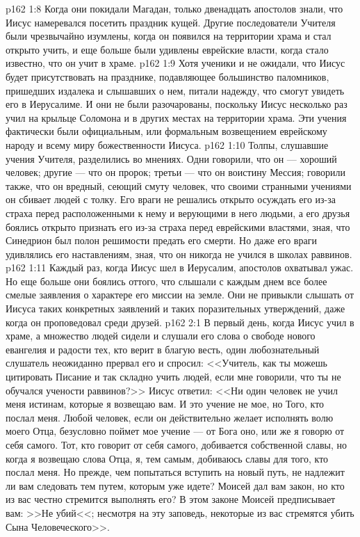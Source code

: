 \vs p162 1:8 Когда они покидали Магадан, только двенадцать апостолов знали, что Иисус намеревался посетить праздник кущей. Другие последователи Учителя были чрезвычайно изумлены, когда он появился на территории храма и стал открыто учить, и еще больше были удивлены еврейские власти, когда стало известно, что он учит в храме.
\vs p162 1:9 Хотя ученики и не ожидали, что Иисус будет присутствовать на празднике, подавляющее большинство паломников, пришедших издалека и слышавших о нем, питали надежду, что смогут увидеть его в Иерусалиме. И они не были разочарованы, поскольку Иисус несколько раз учил на крыльце Соломона и в других местах на территории храма. Эти учения фактически были официальным, или формальным возвещением еврейскому народу и всему миру божественности Иисуса.
\vs p162 1:10 Толпы, слушавшие учения Учителя, разделились во мнениях. Одни говорили, что он --- хороший человек; другие --- что он пророк; третьи --- что он воистину Мессия; говорили также, что он вредный, сеющий смуту человек, что своими странными учениями он сбивает людей с толку. Его враги не решались открыто осуждать его из\hyp{}за страха перед расположенными к нему и верующими в него людьми, а его друзья боялись открыто признать его из\hyp{}за страха перед еврейскими властями, зная, что Синедрион был полон решимости предать его смерти. Но даже его враги удивлялись его наставлениям, зная, что он никогда не учился в школах раввинов.
\vs p162 1:11 Каждый раз, когда Иисус шел в Иерусалим, апостолов охватывал ужас. Но еще больше они боялись оттого, что слышали с каждым днем все более смелые заявления о характере его миссии на земле. Они не привыкли слышать от Иисуса таких конкретных заявлений и таких поразительных утверждений, даже когда он проповедовал среди друзей.
\vs p162 2:1 В первый день, когда Иисус учил в храме, а множество людей сидели и слушали его слова о свободе нового евангелия и радости тех, кто верит в благую весть, один любознательный слушатель неожиданно прервал его и спросил: <<Учитель, как ты можешь цитировать Писание и так складно учить людей, если мне говорили, что ты не обучался учености раввинов?>> Иисус ответил: <<Ни один человек не учил меня истинам, которые я возвещаю вам. И это учение не мое, но Того, кто послал меня. Любой человек, если он действительно желает исполнять волю моего Отца, безусловно поймет мое учение --- от Бога оно, или же я говорю от себя самого. Тот, кто говорит от себя самого, добивается собственной славы, но когда я возвещаю слова Отца, я, тем самым, добиваюсь славы для того, кто послал меня. Но прежде, чем попытаться вступить на новый путь, не надлежит ли вам следовать тем путем, которым уже идете? Моисей дал вам закон, но кто из вас честно стремится выполнять его? В этом законе Моисей предписывает вам: >>Не убий<<; несмотря на эту заповедь, некоторые из вас стремятся убить Сына Человеческого>>.
